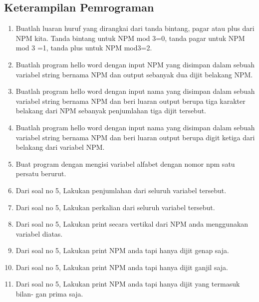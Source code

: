 \subsection{Keterampilan Pemrograman}
\begin{enumerate}
    \item Buatlah luaran huruf yang dirangkai dari tanda bintang, pagar atau plus dari
    NPM kita. Tanda bintang untuk NPM mod 3=0, tanda pagar untuk NPM mod
    3 =1, tanda plus untuk NPM mod3=2.
    

    \item Buatlah program hello word dengan input NPM yang disimpan dalam sebuah
    variabel string bernama NPM dan output sebanyak dua dijit belakang NPM.
    
    
    \item Buatlah program hello word dengan input nama yang disimpan dalam sebuah
    variabel string bernama NPM dan beri luaran output berupa tiga karakter
    belakang dari NPM sebanyak penjumlahan tiga dijit tersebut.
    

    \item Buatlah program hello word dengan input nama yang disimpan dalam sebuah
    variabel string bernama NPM dan beri luaran output berupa digit ketiga dari
    belakang dari variabel NPM.
    

    \item Buat program dengan mengisi variabel alfabet
    dengan nomor npm satu persatu berurut.
    

    \item Dari soal no 5, Lakukan penjumlahan dari seluruh variabel tersebut.
    

    \item Dari soal no 5, Lakukan perkalian dari seluruh variabel tersebut.
    

    \item Dari soal no 5, Lakukan print secara vertikal dari NPM anda menggunakan
    variabel diatas.
    

    \item Dari soal no 5, Lakukan print NPM anda tapi hanya dijit genap saja.
    

    \item Dari soal no 5, Lakukan print NPM anda tapi hanya dijit ganjil saja.
    

    \item Dari soal no 5, Lakukan print NPM anda tapi hanya dijit yang termasuk bilan-
    gan prima saja.
    

\end{enumerate}
